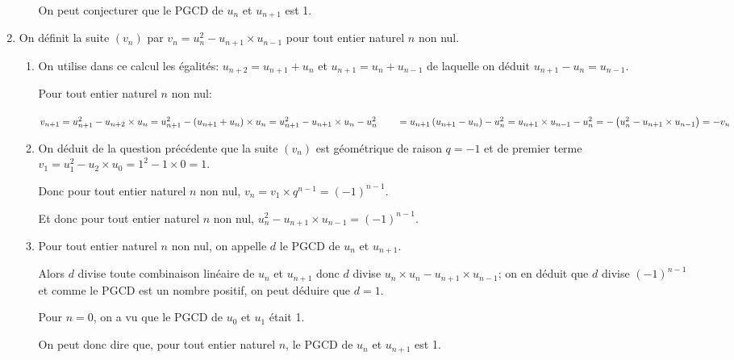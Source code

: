 \documentclass[10pt,a4paper]{article}
\begin{document}
\begin{enumerate}
\begin{enumerate}
On peut conjecturer que le PGCD de $u_{n}$ et $u_{n+1}$ est 1.
\end{enumerate}

\item On définit la suite $(v_n)$ par $v_n=u_n^2 - u_{n+1}\times u_{n-1}$ pour tout entier naturel $n$ non nul.
\begin{enumerate}
\item On utilise dans ce calcul les égalités:
$u_{n+2} = u_{n+1} + u_n$ et
$u_{n+1} = u_{n} + u_{n-1}$ de laquelle on déduit $u_{n+1} - u_n = u_{n-1}$.

Pour tout entier naturel $n$ non nul:

$v_{n+1}= u_{n+1}^2 - u_{n+2}\times u_{n} 
= u_{n+1}^2 - \left (u_{n+1} + u_{n}\right )\times u_{n} 
= u_{n+1}^2 - u_{n+1}\times u_{n} - u_{n}^2\\[3pt]
\phantom{v_{n+1}}
= u_{n+1} \left ( u_{n+1} - u_n\right )  - u_n^2
= u_{n+1}\times u_{n-1} - u_n^2
= - \left (  u_n^2 - u_{n+1}\times u_{n-1}\right )
= - v_n$

\item%

On déduit de la question précédente que la suite $(v_n)$ est géométrique de raison $q=-1$ et de premier terme $v_1=u_1^2 - u_2\times u_0=1^2-1\times 0 = 1$.

Donc pour tout entier naturel $n$ non nul, $v_n=v_1\times q^{n-1}= \left (-1\right )^{n-1}$.

Et donc pour tout entier naturel $n$ non nul, $u_n^2 - u_{n+1}\times u_{n-1} = \left (-1\right )^{n-1}.$

\item%
Pour tout entier naturel $n$ non nul, on appelle $d$ le PGCD de $u_{n}$ et $u_{n+1}$.

Alors $d$ divise toute combinaison linéaire de $u_{n}$ et $u_{n+1}$ donc $d$ divise $u_n\times u_n - u_{n+1}\times u_{n-1} $; on en déduit que $d$ divise $(-1)^{n-1}$ et comme le PGCD est un nombre positif, on peut déduire que $d=1$.

Pour $n=0$, on a vu que le PGCD de $u_0$ et $u_1$ était 1.

On peut donc dire que, pour tout entier naturel $n$, le PGCD de $u_n$ et $u_{n+1}$ est 1.

\end{enumerate}
\end{enumerate}
\end{document}
